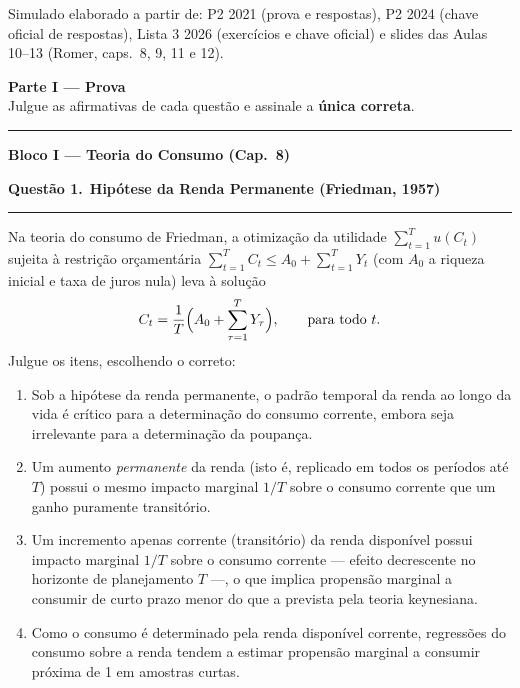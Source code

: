 \documentclass[12pt, a4paper]{article}
\newcommand{\provaquestao}[2]{%
  \par\vspace{0.9em}%
  {\large\bfseries\color{cyanrbc} Questão #1.}\ {\bfseries #2}\par
  \vspace{-0.45em}\rule{\linewidth}{0.4pt}\par\vspace{0.1em}}
\begin{document}
\begin{titlepage}
\begin{center}
\vfill
{\small Simulado elaborado a partir de: P2 2021 (prova e respostas), P2 2024
(chave oficial de respostas), Lista 3 2026 (exercícios e chave oficial) e slides
das Aulas 10--13 (Romer, caps.\ 8, 9, 11 e 12).}
\end{center}
\end{titlepage}

\begin{center}
{\LARGE\bfseries\color{orangerbc} Parte I --- Prova}\\[0.3em]
{\normalsize\color{grayrbc} Julgue as afirmativas de cada questão e assinale a \textbf{única correta}.}\\[0.2em]
\rule{\linewidth}{0.8pt}
\end{center}

\begin{center}
{\large\bfseries\color{cyanrbc} Bloco I --- Teoria do Consumo (Cap.\ 8)}
\end{center}

\provaquestao{1}{Hipótese da Renda Permanente (Friedman, 1957)}

Na teoria do consumo de Friedman, a otimização da utilidade
$\sum_{t=1}^{T} u(C_t)$ sujeita à restrição orçamentária
$\sum_{t=1}^{T} C_t \leq A_0 + \sum_{t=1}^{T} Y_t$ (com $A_0$ a riqueza inicial
e taxa de juros nula) leva à solução
\[
C_t = \frac{1}{T}\Bigl(A_0 + \sum_{\tau=1}^{T} Y_\tau\Bigr), \qquad \text{para todo } t.
\]
Julgue os itens, escolhendo o correto:

\begin{enumerate}[label=\alph*)]
\item Sob a hipótese da renda permanente, o padrão temporal da renda ao longo
da vida é crítico para a determinação do consumo corrente, embora seja
irrelevante para a determinação da poupança.
\item Um aumento \emph{permanente} da renda (isto é, replicado em todos os
períodos até $T$) possui o mesmo impacto marginal $1/T$ sobre o consumo
corrente que um ganho puramente transitório.
\item Um incremento apenas corrente (transitório) da renda disponível possui
impacto marginal $1/T$ sobre o consumo corrente --- efeito decrescente no
horizonte de planejamento $T$ ---, o que implica propensão marginal a consumir
de curto prazo menor do que a prevista pela teoria keynesiana.
\item Como o consumo é determinado pela renda disponível corrente, regressões
do consumo sobre a renda tendem a estimar propensão marginal a consumir
próxima de 1 em amostras curtas.
\end{enumerate}
\end{document}

